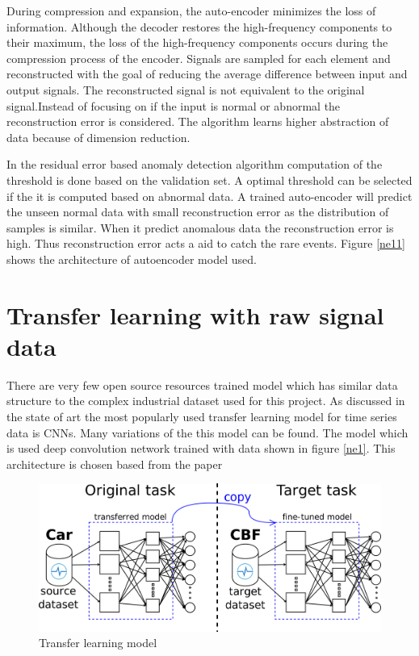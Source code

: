     
    During compression and expansion, the auto-encoder minimizes the loss of information. Although the decoder restores the high-frequency components to their maximum, the loss of the high-frequency components occurs during the compression process of the encoder. Signals are sampled for each element and reconstructed with the goal of reducing the average difference between input and output signals. The reconstructed signal is not equivalent to the original signal.Instead of focusing on if the input is normal or abnormal the reconstruction error is considered. The algorithm learns higher abstraction of data because of dimension reduction.
    
    In the residual error based anomaly detection algorithm computation of the threshold is done based on the validation set. A optimal threshold can be selected if the it is computed based on abnormal data. A trained auto-encoder will predict the unseen normal data with small reconstruction error as the distribution of samples is similar. When it predict anomalous data the reconstruction error is high. Thus reconstruction error acts a aid to catch the rare events. 
    Figure \ref{ne11} shows the architecture of autoencoder model used. 
   
  
  
   \section{Transfer learning with raw signal data}
There are very few open source resources trained model which has similar data structure to the complex industrial dataset used for this project. As discussed in the state of art the most popularly used transfer learning model for time series data is CNNs. Many variations of the this model can be found. The model which is used deep convolution network trained with data shown in figure \ref{ne1}. This architecture is chosen based from the paper \cite{fawaz2018transfer}

  \begin{figure}[h]
  	\centering
  	\includegraphics[width=0.9\linewidth]{images/transferss.png}
  	\caption{Transfer learning model \cite{fawaz2018transfer} }
  	\label{n01}
  \end{figure}
   
